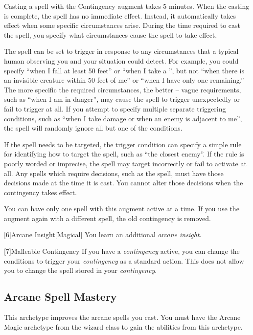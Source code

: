        Casting a spell with the Contingency augment takes 5 minutes.
        When the casting is complete, the spell has no immediate effect.
        Instead, it automatically takes effect when some specific circumstances arise.
        During the time required to cast the spell, you specify what circumstances cause the spell to take effect.

        The spell can be set to trigger in response to any circumstances that a typical human observing you and your situation could detect.
        For example, you could specify ``when I fall at least 50 feet'' or ``when I take a '', but not ``when there is an invisible creature within 50 feet of me'' or ``when I have only one  remaining.''
        The more specific the required circumstances, the better -- vague requirements, such as ``when I am in danger'', may cause the spell to trigger unexpectedly or fail to trigger at all.
        If you attempt to specify multiple separate triggering conditions, such as ``when I take damage or when an enemy is adjacent to me'', the spell will randomly ignore all but one of the conditions.

        If the spell needs to be targeted, the trigger condition can specify a simple rule for identifying how to target the spell, such as ``the closest enemy''.
        If the rule is poorly worded or imprecise, the spell may target incorrectly or fail to activate at all.
        Any spells which require decisions, such as the  spell, must have those decisions made at the time it is cast.
        You cannot alter those decisions when the contingency takes effect.

        You can have only one spell with this augment active at a time.
        If you use the augment again with a different spell, the old contingency is removed.

        [6]{Arcane Insight}[Magical]
        You learn an additional \textit{arcane insight}.

        [7]{Malleable Contingency} If you have a \textit{contingency} active, you can change the conditions to trigger your \textit{contingency} as a standard action.
        This does not allow you to change the spell stored in your \textit{contingency}.

    \subsection{Arcane Spell Mastery}
        This archetype improves the arcane spells you cast.
        You must have the Arcane Magic archetype from the wizard class to gain the abilities from this archetype.

